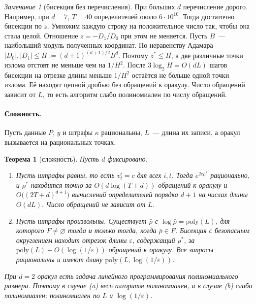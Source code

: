 \documentclass[a4paper,11pt]{article}
\theoremstyle{plain}
\newtheorem{theorem}{Теорема}[section]
\theoremstyle{definition}
\theoremstyle{remark}
\newtheorem*{remark}{Замечание}
\newcommand{\abs}[1]{\left\lvert #1 \right\rvert}
\begin{document}
\begin{remark}[бисекция без перечисления]
    При больших $d$ перечисление дорого. Например, при $d=7$, $T=40$ определителей около $6\cdot10^{10}$. Тогда достаточно бисекции по $z$. Умножим каждую строку на положительное число так, чтобы она стала целой. Отношение $z=-D_1/D_0$ при этом не меняется. Пусть $B$~--- наибольший модуль полученных координат. По неравенству Адамара $\abs{D_0},\abs{D_1}\le H:=(d+1)^{(d+1)/2}B^d$. Поэтому $z^*\le H$, а две различные точки излома отстоят не меньше чем на $1/H^2$. После $3\log_2H=O(dL)$ шагов бисекции на отрезке длины меньше $1/H^2$ остаётся не больше одной точки излома. Её находят цепной дробью без обращений к оракулу. Число обращений зависит от $L$, то есть алгоритм слабо полиномиален по числу обращений.
\end{remark}

\paragraph{Сложность.} Пусть данные $P$, $y$ и штрафы $\kappa$ рациональны, $L$~--- длина их записи, а оракул вызывается на рациональных точках.

\begin{theorem}[сложность]\label{thm:complexity}
    Пусть $d$ фиксировано.
    \begin{enumerate}[label=(\alph*)]
        \item Пусть штрафы равны, то есть $v^i_t=c$ для всех $i,t$. Тогда $e^{2c\rho^*}$ рационально, и $\rho^*$ находится точно за $O(d\log(T+d))$ обращений к оракулу и $O\bigl((2T+d)^{d+1}\bigr)$ вычислений определителей порядка $d+1$ на числах длины $O(dL)$. Число обращений не зависит от $L$.
        \item Пусть штрафы произвольны. Существует $\bar\rho$ с $\log\bar\rho=\mathrm{poly}(L)$, для которого $F\ne\varnothing$ тогда и только тогда, когда $\bar\rho\in F$. Бисекция с безопасным округлением находит отрезок длины $\varepsilon$, содержащий $\rho^*$, за $\mathrm{poly}(L)+O(\log(1/\varepsilon))$ обращений к оракулу. Все запросы рациональны и имеют длину $\mathrm{poly}(L,\log(1/\varepsilon))$.
    \end{enumerate}
    При $d=2$ оракул есть задача линейного программирования полиномиального размера. Поэтому в случае (a) весь алгоритм полиномиален, а в случае (b) слабо полиномиален: полиномиален по $L$ и $\log(1/\varepsilon)$.
\end{theorem}
\end{document}
